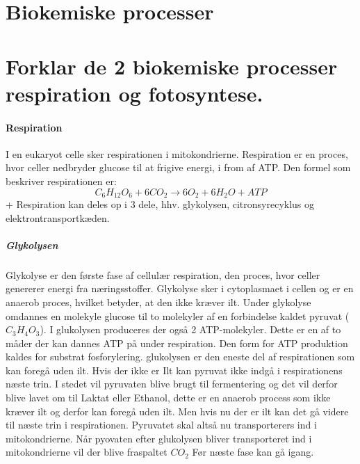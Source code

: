 \newpage
\part{Biokemiske processer}
    \part{Forklar de 2 biokemiske processer respiration og fotosyntese.}
        \subsection*{Respiration}\label{sec:respiration}
            I en eukaryot celle sker respirationen i mitokondrierne. Respiration er en proces, hvor celler nedbryder glucose til at frigive energi, i from af ATP.
            Den formel som beskriver respirationen er: \begin{equation}C_6H_{12}O_6 + 6CO_2 \rightarrow 6O_2 + 6H_2O + ATP \end{equation}+
            Respiration kan deles op i 3 dele, hhv. glykolysen, citronsyrecyklus og elektrontransportkæden.

            \subsubsection*{Glykolysen}
                Glykolyse er den første fase af cellulær respiration, den proces, hvor celler genererer energi fra næringsstoffer. Glykolyse sker i cytoplasmaet i cellen og er en anaerob proces, hvilket betyder, at den ikke kræver ilt. Under glykolyse omdannes en molekyle glucose til to molekyler af en forbindelse kaldet pyruvat (\begin{math}C_3H_4O_3\end{math}). I glukolysen produceres der også 2 ATP-molekyler. Dette er en af to måder der kan dannes ATP på under respiration. Den form for ATP produktion kaldes for substrat fosforylering. glukolysen er den eneste del af respirationen som kan foregå uden ilt. Hvis der ikke er Ilt kan pyruvat ikke indgå  i respirationens næste trin. I stedet vil pyruvaten blive brugt til fermentering og det vil derfor blive lavet om til Laktat eller Ethanol, dette er en anaerob process som ikke kræver ilt og derfor kan foregå uden ilt. Men hvis nu der er ilt kan det gå videre til næste trin i respirationen. Pyruvatet skal altså nu transporterers ind i mitokondrierne. Når pyovaten efter glukolysen bliver transporteret ind i mitokondrierne vil der blive fraspaltet \begin{math}
                CO_2\end{math} Før næste fase kan gå igang. 

